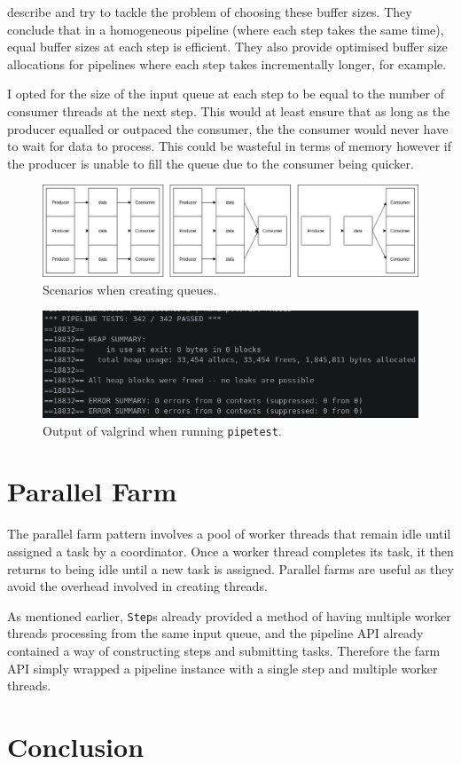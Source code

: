 \documentclass[12pt]{article}
\def\code#1{\texttt{#1}}
\begin{document}
\cite{buffer} describe and try to tackle the problem of choosing these buffer sizes. They conclude that in a homogeneous pipeline (where each step takes the same time), equal buffer sizes at each step is efficient. They also provide optimised buffer size allocations for pipelines where each step takes incrementally longer, for example. 

I opted for the size of the input queue at each step to be equal to the number of consumer threads at the next step. This would at least ensure that as long as the producer equalled or outpaced the consumer, the the consumer would never have to wait for data to process. This could be wasteful in terms of memory however if the producer is unable to fill the queue due to the consumer being quicker.

\begin{figure}[!ht]
	\centering 
	\includegraphics[width=\linewidth]{images/qsize}
	\caption{Scenarios when creating queues.}
	\label{fig:qsize}
\end{figure}

\begin{figure}[!ht]
	\centering 
	\includegraphics[width=0.8\linewidth]{images/pipetest}
	\caption{Output of valgrind when running \code{pipetest}.}
	\label{fig:pipetest}
\end{figure}

\section{Parallel Farm}

The parallel farm pattern involves a pool of worker threads that remain idle until assigned a task by a coordinator. Once a worker thread completes its task, it then returns to being idle until a new task is assigned. Parallel farms are useful as they avoid the overhead involved in creating threads. 

As mentioned earlier, \code{Step}s already provided a method of having multiple worker threads processing from the same input queue, and the pipeline API already contained a way of constructing steps and submitting tasks. Therefore the farm API simply wrapped a pipeline instance with a single step and multiple worker threads.

\section*{Conclusion}



\end{document}

